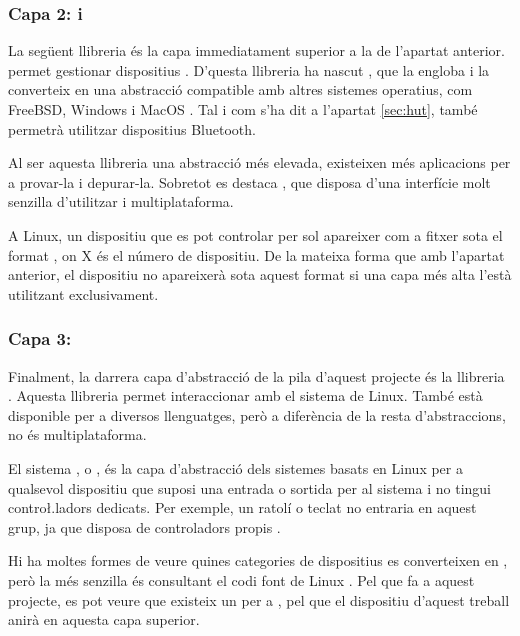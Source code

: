 \subsubsection*{Capa 2:  i }

La següent llibreria és la capa immediatament superior a la de l'apartat
anterior.  permet gestionar dispositius . D'questa
llibreria ha nascut , que la engloba i la converteix en
una abstracció compatible amb altres sistemes operatius, com
FreeBSD, Windows i MacOS \cite{Libhid}. Tal i com s'ha dit a 
l'apartat \ref{sec:hut}, també permetrà utilitzar dispositius Bluetooth.

Al ser aquesta llibreria una abstracció més elevada, existeixen més aplicacions
per a provar-la i depurar-la. Sobretot es destaca \cite{LibhidUI}, que disposa
d'una interfície molt senzilla d'utilitzar i multiplataforma.

A Linux, un dispositiu que es pot controlar per  sol apareixer com
a fitxer sota el format , on X és el número de dispositiu.
De la mateixa forma que amb l'apartat anterior, el dispositiu no apareixerà
sota aquest format si una capa més alta l'està utilitzant exclusivament.

\subsubsection*{Capa 3: }

Finalment, la darrera capa d'abstracció de la pila d'aquest projecte és la
llibreria .
Aquesta llibreria permet interaccionar amb el sistema
 de Linux. També està disponible per a diversos llenguatges, però
a diferència de la resta d'abstraccions, no és multiplataforma.

El sistema , o , és la capa d'abstracció
dels sistemes basats en Linux per a qualsevol dispositiu que suposi una entrada
o sortida per al sistema i no tingui contro\l.ladors dedicats. Per exemple, un
ratolí o teclat no entraria en aquest grup, ja que disposa de controladors
propis \cite{Iio}.

Hi ha moltes formes de veure quines categories de dispositius  es
converteixen en , però la més senzilla és consultant el codi
font de Linux \cite{KernelIioAccel}. Pel que fa a aquest projecte, es pot veure
que existeix un  per a , pel que
el dispositiu d'aquest treball anirà en aquesta capa superior.

